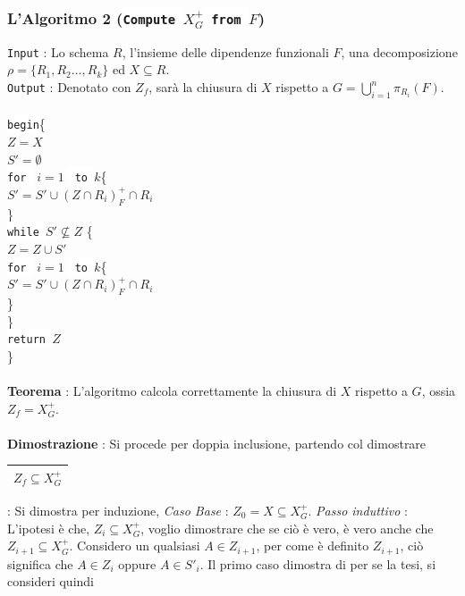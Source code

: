 \documentclass[12pt, letterpaper]{article}
\newcommand{\code}[1]{\colorbox{light-gray}{\texttt{#1}}}
\newcommand{\codee}[1]{\colorbox{white}{\texttt{#1}}}
\newcommand{\acc}{\\\hphantom{}\\}
\newcommand{\boxedMath}[1]{\begin{tabular}{|c|}\hline \texttt{#1} \\ \hline\end{tabular} :}
\begin{document}
\subsubsection{L'Algoritmo 2 (\codee{Compute }\(X^+_G\)\codee{ from }\(F\))} \label{alg2}
\code{Input} : Lo schema \(R\), l'insieme delle dipendenze funzionali \(F\), una decomposizione \(
    \rho = \{R_1,R_2\dots,R_k\}\) ed \(X\subseteq R\).\\
\code{Output} : Denotato con \(Z_f\), sarà la chiusura di \(X\) rispetto a \(G=\displaystyle\bigcup^n_{i=1}\pi_{R_i}(F)\).\\\hphantom{}\\
\hphantom{ident}\codee{begin}\{\\
\hphantom{ident}\hphantom{ident}\(Z=X\)\\
\hphantom{ident}\hphantom{ident}\(S'=\emptyset\)\\
\hphantom{ident}\hphantom{ident}\codee{for } \(i=1\) \codee{ to }\(k\)\{\\
\hphantom{ident}\hphantom{ident}\hphantom{ident}\(S'=S'\cup (Z\cap R_i)^+_F\cap R_i\)\\
\hphantom{ident}\hphantom{ident} \}\\
\hphantom{ident}\hphantom{ident}\codee{while }\(S' \nsubseteq  Z\) \{\\
\hphantom{ident}\hphantom{ident}\hphantom{ident}\(Z=Z\cup S'\)\\
\hphantom{ident}\hphantom{ident}\hphantom{ident}\codee{for } \(i=1\) \codee{ to }\(k\)\{\\
\hphantom{ident}\hphantom{ident}\hphantom{ident}\hphantom{ident}\(S'=S'\cup (Z\cap R_i)^+_F\cap R_i\)\\
\hphantom{ident}\hphantom{ident}\hphantom{ident} \}\\
\hphantom{ident}\hphantom{ident} \}\\
\hphantom{ident}\hphantom{ident} \codee{return }\(Z\)\\
\hphantom{ident}\}\acc 
\textbf{Teorema }: L'algoritmo calcola correttamente la chiusura di \(X\) rispetto a \(G\), ossia \(Z_f=X^+_G\).\acc 
\textbf{Dimostrazione }: Si procede per doppia inclusione, partendo col dimostrare \boxedMath{\(Z_f\subseteq X_G^+\)}  Si dimostra 
per induzione, \textit{Caso Base }: \(Z_0=X\subseteq X_G^+\). \textit{Passo induttivo }: L'ipotesi è che, \(Z_i\subseteq X_G^+\), voglio dimostrare 
che se ciò è vero, è vero anche che  \(Z_{i+1}\subseteq X_G^+\). Considero un qualsiasi \(A\in Z_{i+1}\), per come è 
definito \(Z_{i+1}\), ciò significa che \(A\in Z_i\) oppure \(A\in S'_i\). Il primo caso dimostra di per se la tesi, si consideri quindi 
\end{document}
